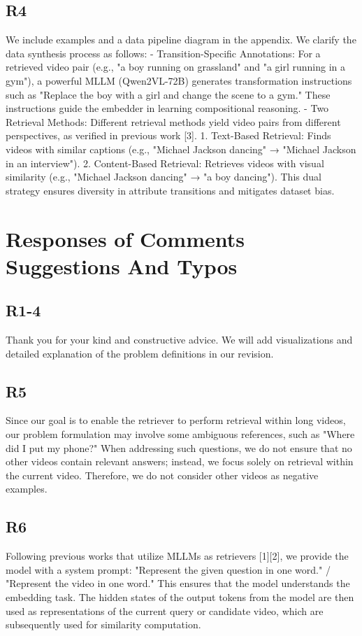 \documentclass[11pt]{article}
\begin{document}
\subsection{R4}
We include examples and a data pipeline diagram in the appendix. We clarify the data synthesis process as follows:
- Transition-Specific Annotations: For a retrieved video pair (e.g., "a boy running on grassland" and "a girl running in a gym"), a powerful MLLM (Qwen2VL-72B) generates transformation instructions such as "Replace the boy with a girl and change the scene to a gym." These instructions guide the embedder in learning compositional reasoning.
- Two Retrieval Methods:
 Different retrieval methods yield video pairs from different perspectives, as verified in previous work [3].
  1. Text-Based Retrieval: Finds videos with similar captions (e.g., "Michael Jackson dancing" → "Michael Jackson in an interview").
  2. Content-Based Retrieval: Retrieves videos with visual similarity (e.g., "Michael Jackson dancing" → "a boy dancing").
This dual strategy ensures diversity in attribute transitions and mitigates dataset bias.

\section{Responses of Comments Suggestions And Typos}
\subsection{R1-4} Thank you for your kind and constructive advice. We will add visualizations and detailed explanation of the problem definitions in our revision.
\subsection{R5} Since our goal is to enable the retriever to perform retrieval within long videos, our problem formulation may involve some ambiguous references, such as "Where did I put my phone?" When addressing such questions, we do not ensure that no other videos contain relevant answers; instead, we focus solely on retrieval within the current video. Therefore, we do not consider other videos as negative examples.
\subsection{R6} Following previous works that utilize MLLMs as retrievers [1][2], we provide the model with a system prompt: "Represent the given question in one word." / "Represent the video in one word." This ensures that the model understands the embedding task. The hidden states of the output tokens from the model are then used as representations of the current query or candidate video, which are subsequently used for similarity computation.
\end{document}

